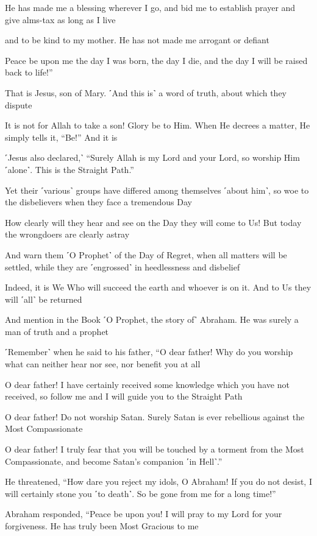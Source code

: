 He has made me a blessing wherever I go, and bid me to establish prayer and give alms-tax as long as I live

and to be kind to my mother. He has not made me arrogant or defiant

Peace be upon me the day I was born, the day I die, and the day I will be raised back to life!”

That is Jesus, son of Mary. ˹And this is˺ a word of truth, about which they dispute

It is not for Allah to take a son! Glory be to Him. When He decrees a matter, He simply tells it, “Be!” And it is

˹Jesus also declared,˺ “Surely Allah is my Lord and your Lord, so worship Him ˹alone˺. This is the Straight Path.”

Yet their ˹various˺ groups have differed among themselves ˹about him˺, so woe to the disbelievers when they face a tremendous Day

How clearly will they hear and see on the Day they will come to Us! But today the wrongdoers are clearly astray

And warn them ˹O Prophet˺ of the Day of Regret, when all matters will be settled, while they are ˹engrossed˺ in heedlessness and disbelief

Indeed, it is We Who will succeed the earth and whoever is on it. And to Us they will ˹all˺ be returned

And mention in the Book ˹O Prophet, the story of˺ Abraham. He was surely a man of truth and a prophet

˹Remember˺ when he said to his father, “O dear father! Why do you worship what can neither hear nor see, nor benefit you at all

O dear father! I have certainly received some knowledge which you have not received, so follow me and I will guide you to the Straight Path

O dear father! Do not worship Satan. Surely Satan is ever rebellious against the Most Compassionate

O dear father! I truly fear that you will be touched by a torment from the Most Compassionate, and become Satan’s companion ˹in Hell˺.”

He threatened, “How dare you reject my idols, O Abraham! If you do not desist, I will certainly stone you ˹to death˺. So be gone from me for a long time!”

Abraham responded, “Peace be upon you! I will pray to my Lord for your forgiveness. He has truly been Most Gracious to me

